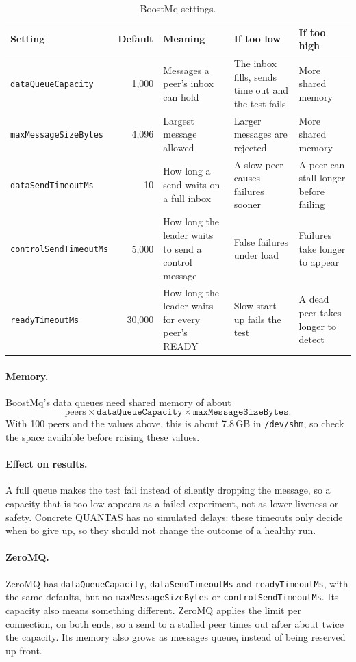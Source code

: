 \documentclass[11pt,a4paper]{article}
\newcommand{\code}[1]{\texttt{#1}}
\begin{document}
\begin{table}[!htbp]
  \centering
  \small
  \begin{tabular}{@{}lrp{3.2cm}p{3.4cm}p{3.1cm}@{}}
    \toprule
    Setting & Default & Meaning & If too low & If too high \\
    \midrule
    \code{dataQueueCapacity} & 1,000 & Messages a peer's inbox can hold & The inbox fills, sends time
      out and the test fails & More shared memory \\
    \code{maxMessageSizeBytes} & 4,096 & Largest message allowed & Larger messages are rejected &
      More shared memory \\
    \code{dataSendTimeoutMs} & 10 & How long a send waits on a full inbox & A slow peer causes
      failures sooner & A peer can stall longer before failing \\
    \code{controlSendTimeoutMs} & 5,000 & How long the leader waits to send a control message &
      False failures under load & Failures take longer to appear \\
    \code{readyTimeoutMs} & 30,000 & How long the leader waits for every peer's READY & Slow
      start-up fails the test & A dead peer takes longer to detect \\
    \bottomrule
  \end{tabular}
  \caption{BoostMq settings.}
  \label{tab:boostmq}
\end{table}

\paragraph{Memory.} BoostMq's data queues need shared memory of about
\[ \text{peers} \times \texttt{dataQueueCapacity} \times \texttt{maxMessageSizeBytes}. \]
With 100 peers and the values above, this is about 7.8\,GB in \code{/dev/shm}, so check the space
available before raising these values.

\paragraph{Effect on results.} A full queue makes the test fail instead of silently dropping the
message, so a capacity that is too low appears as a failed experiment, not as lower liveness or
safety. Concrete QUANTAS has no simulated delays: these timeouts only decide when to give up, so they
should not change the outcome of a healthy run.

\paragraph{ZeroMQ.} ZeroMQ has \code{dataQueueCapacity}, \code{dataSendTimeoutMs} and
\code{readyTimeoutMs}, with the same defaults, but no \code{maxMessageSizeBytes} or
\code{controlSendTimeoutMs}. Its capacity also means something different. ZeroMQ applies the limit
per connection, on both ends, so a send to a stalled peer times out after about twice the capacity.
Its memory also grows as messages queue, instead of being reserved up front.
\end{document}
